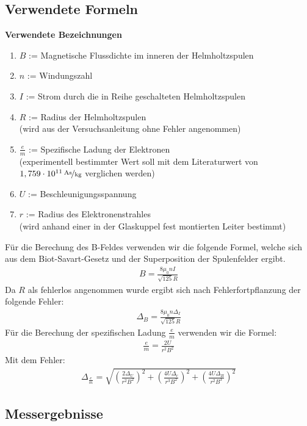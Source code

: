 \documentclass[12pt,a4paper]{article}
\begin{document}
\subsection{Verwendete Formeln}
\textbf{Verwendete Bezeichnungen}
\begin{enumerate}
\item $B$ := Magnetische Flussdichte im inneren der Helmholtzspulen
\item $n$ := Windungszahl
\item $I$ := Strom durch die in Reihe geschalteten Helmholtzspulen
\item $R$ := Radius der Helmholtzspulen\\
(wird aus der Versuchsanleitung ohne Fehler angenommen)
\item $\frac{e}{m}$ := Spezifische Ladung der Elektronen\\
(experimentell bestimmter Wert soll mit dem Literaturwert von $\unitfrac[1,759\cdot10^{11}]{As}{kg}$ verglichen werden)
\item $U$ := Beschleunigungsspannung
\item $r$ := Radius des Elektronenstrahles\\
(wird anhand einer in der Glaskuppel fest montierten Leiter bestimmt)
\end{enumerate}
Für die Berechung des B-Feldes verwenden wir die folgende Formel, welche sich aus dem Biot-Savart-Gesetz und der Superposition der Spulenfelder ergibt.
\begin{align}
B = \frac{8\mu_0 n I}{\sqrt{125} R}
\end{align}
Da $R$ als fehlerlos angenommen wurde ergibt sich nach Fehlerfortpflanzung der folgende Fehler:
\begin{align}
\Delta_B = \frac{8\mu_0 n \Delta_I}{\sqrt{125} R}
\end{align}
Für die Berechung der spezifischen Ladung $\frac{e}{m}$ verwenden wir die Formel:
\begin{align}
\frac{e}{m} = \frac{2U}{r^2B^2}
\end{align}
Mit dem Fehler:
\begin{align}
\Delta_{\frac{e}{m}} = \sqrt{
\left(\frac{2\Delta_U}{r^2B^2}\right)^2+
\left(\frac{4U\Delta_r}{r^3B^2}\right)^2+
\left(\frac{4U\Delta_B}{r^2B^3}\right)^2}
\end{align}
\subsection{Messergebnisse}
\end{document}

